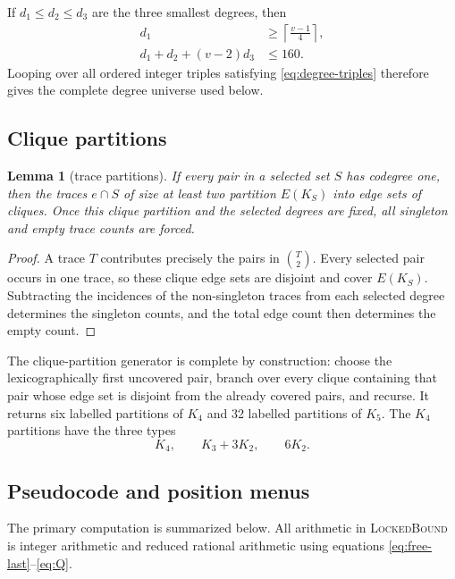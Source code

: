 \documentclass[11pt]{article}
\newtheorem{lemma}[theorem]{Lemma}
\theoremstyle{remark}
\begin{document}
If $d_1\le d_2\le d_3$ are the three smallest degrees, then
\begin{equation}\label{eq:degree-triples}
\begin{aligned}
d_1&\ge\left\lceil\frac{v-1}{4}\right\rceil,\\
d_1+d_2+(v-2)d_3&\le160.
\end{aligned}
\end{equation}
Looping over all ordered integer triples satisfying \eqref{eq:degree-triples}
therefore gives the complete degree universe used below.

\subsection{Clique partitions}

\begin{lemma}[trace partitions]\label{lem:trace}
If every pair in a selected set $S$ has codegree one, then the traces
$e\cap S$ of size at least two partition $E(K_S)$ into edge sets of cliques.
Once this clique partition and the selected degrees are fixed, all singleton
and empty trace counts are forced.
\end{lemma}

\begin{proof}
A trace $T$ contributes precisely the pairs in $\binom T2$.  Every selected
pair occurs in one trace, so these clique edge sets are disjoint and cover
$E(K_S)$.  Subtracting the incidences of the non-singleton traces from each
selected degree determines the singleton counts, and the total edge count
then determines the empty count.
\end{proof}

The clique-partition generator is complete by construction: choose the
lexicographically first uncovered pair, branch over every clique containing
that pair whose edge set is disjoint from the already covered pairs, and
recurse.  It returns six labelled partitions of $K_4$ and 32 labelled
partitions of $K_5$.  The $K_4$ partitions have the three types
\[
K_4,\qquad K_3+3K_2,\qquad 6K_2.
\]

\subsection{Pseudocode and position menus}

The primary computation is summarized below.  All arithmetic in
\textsc{LockedBound} is integer arithmetic and reduced rational arithmetic
using equations \eqref{eq:free-last}--\eqref{eq:Q}.
\end{document}
